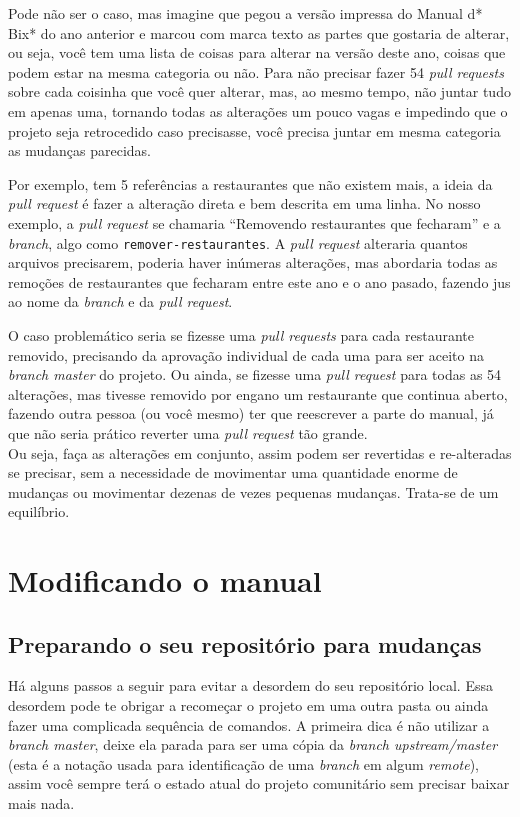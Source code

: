 \documentclass[a4paper,oneside,10pt]{memoir}
\begin{document}
Pode não ser o caso, mas imagine que pegou a versão impressa do Manual d* Bix*
do ano anterior e marcou com marca texto as partes que gostaria de alterar, ou
seja, você tem uma lista de coisas para alterar na versão deste ano, coisas que
podem estar na mesma categoria ou não. Para não precisar fazer 54 \emph{pull
requests} sobre cada coisinha que você quer alterar, mas, ao mesmo tempo, não
juntar tudo em apenas uma, tornando todas as alterações um pouco vagas e
impedindo que o projeto seja retrocedido caso precisasse, você precisa juntar
em mesma categoria as mudanças parecidas.

Por exemplo, tem 5 referências a restaurantes que não existem mais, a ideia da
\emph{pull request} é fazer a alteração direta e bem descrita em uma linha. No
nosso exemplo, a \emph{pull request} se chamaria ``Removendo restaurantes que
fecharam'' e a \emph{branch}, algo como \texttt{remover-restaurantes}. A
\emph{pull request} alteraria quantos arquivos precisarem, poderia haver
inúmeras alterações, mas abordaria todas as remoções de restaurantes que
fecharam entre este ano e o ano pasado, fazendo jus ao nome da \emph{branch} e
da \emph{pull request}.

O caso problemático seria se fizesse uma \emph{pull requests} para cada
restaurante removido, precisando da aprovação individual de cada uma para ser
aceito na \emph{branch master} do projeto. Ou ainda, se fizesse uma \emph{pull
request} para todas as 54 alterações, mas tivesse removido por engano um
restaurante que continua aberto, fazendo outra pessoa (ou você mesmo) ter que
reescrever a parte do manual, já que não seria prático reverter uma \emph{pull
request} tão grande.
\\

Ou seja, faça as alterações em conjunto, assim podem ser revertidas e
re-alteradas se precisar, sem a necessidade de movimentar uma quantidade
enor\-me de mudanças ou movimentar dezenas de vezes pequenas mudanças. Trata-se
de um equilíbrio.


\chapter{Modificando o manual}

\section{Preparando o seu repositório para mudanças}

Há alguns passos a seguir para evitar a desordem do seu repositório local. Essa
desordem pode te obrigar a recomeçar o projeto em uma outra pasta ou ainda
fazer uma complicada sequência de comandos. A primeira dica é não utilizar a
\emph{branch master}, deixe ela parada para ser uma cópia da \emph{branch
upstream/master} (esta é a notação usada para identificação de uma
\emph{branch} em algum \emph{remote}), assim você sempre terá o estado atual do
projeto comunitário sem precisar baixar mais nada.
\end{document}
